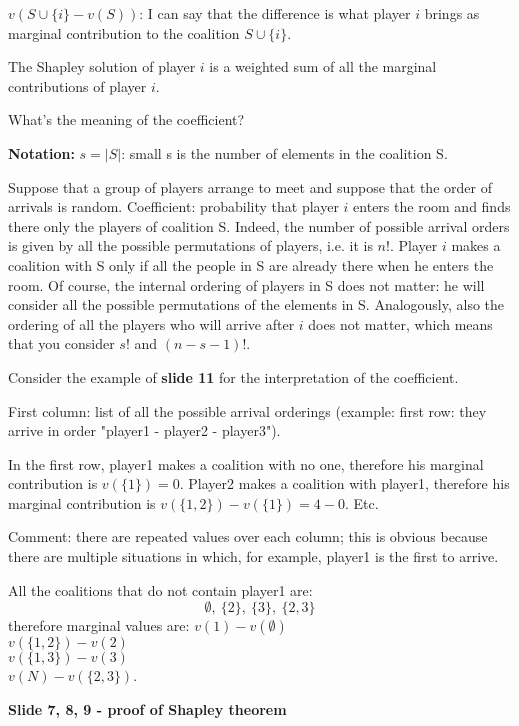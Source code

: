 \noindent $v(S \cup \{i\} - v(S))$: I can say that the difference is what 
player $i$ brings as marginal contribution to the coalition $S \cup \{i\}$.

\noindent The Shapley solution of player $i$ is a weighted sum of all the 
marginal contributions of player $i$. 

\noindent What's the meaning of the coefficient? 

\noindent \textbf{Notation:} $s = |S|$: small s is the number of elements in 
the coalition S.

\noindent Suppose that a group of players arrange to meet and suppose that 
the order of arrivals is random. Coefficient: probability that player $i$ 
enters the room and finds there only the players of coalition S. Indeed, the 
number of possible arrival orders is given by all the possible permutations of 
players, i.e. it is $n!$. Player $i$ makes a coalition with S only if all the 
people in S are already there when he enters the room. Of course, the internal 
ordering of players in S does not matter: he will consider all the possible 
permutations of the elements in S. Analogously, also the ordering of all the 
players who will arrive after $i$ does not matter, which means that you 
consider $s!$ and $(n-s-1)!$.

\noindent Consider the example of \textbf{slide 11} for the interpretation of 
the coefficient.

\noindent First column: list of all the possible arrival orderings (example: 
first row: they arrive in order "player1 - player2 - player3").

\noindent In the first row, player1 makes a coalition with no one, therefore 
his marginal contribution is $v(\{1\}) = 0$. Player2 makes a coalition with 
player1, therefore his marginal contribution is $v(\{1,2\}) - v(\{1\}) = 4 - 0$. 
Etc.

\noindent Comment: there are repeated values over each column; this is obvious 
because there are multiple situations in which, for example, player1 is the 
first to arrive. 

\noindent All the coalitions that do not contain player1 are:
\[
	\emptyset,~ \{2\},~ \{3\},~ \{2,3\}
\]
therefore marginal values are:
$v(1) - v(\emptyset)$\\
$v(\{1,2\}) - v(2)$\\
$v(\{1,3\}) - v(3)$\\
$v(N) - v(\{2,3\})$.

\bigskip
\noindent \textbf{Slide 7, 8, 9 - proof of Shapley theorem}

